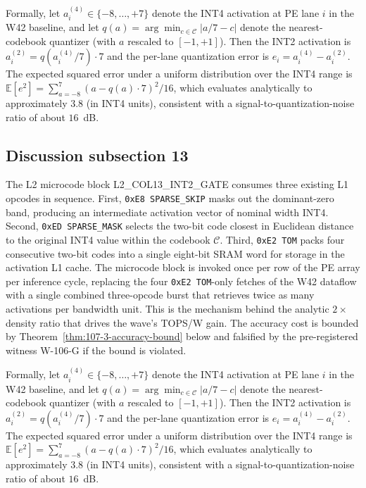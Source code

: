 Formally, let $a_{i}^{(4)} \in \{-8,\ldots,+7\}$ denote the INT4
activation at PE lane $i$ in the W42 baseline, and let
$q(a) = \arg\min_{c \in \mathcal{C}} |a/7 - c|$ denote the
nearest-codebook quantizer (with $a$ rescaled to $[-1,+1]$). Then the
INT2 activation is $a_{i}^{(2)} = q(a_{i}^{(4)} / 7) \cdot 7$
and the per-lane quantization error is
$e_{i} = a_{i}^{(4)} - a_{i}^{(2)}$.
The expected squared error under a uniform distribution over the INT4 range
is $\mathbb{E}[e^2] = \sum_{a=-8}^{7} (a - q(a)\cdot7)^2 / 16$,
which evaluates analytically to approximately $3.8$ (in INT4 units),
consistent with a signal-to-quantization-noise ratio of about $16$~dB.


\subsection{Discussion subsection 13}

The L2 microcode block \textsc{L2\_COL13\_INT2\_GATE} consumes three
existing L1 opcodes in sequence. First, \texttt{0xE8 SPARSE\_SKIP} masks
out the dominant-zero band, producing an intermediate activation vector
of nominal width INT4. Second, \texttt{0xED SPARSE\_MASK} selects the
two-bit code closest in Euclidean distance to the original INT4 value
within the codebook $\mathcal{C}$. Third, \texttt{0xE2 TOM} packs four
consecutive two-bit codes into a single eight-bit SRAM word for storage
in the activation L1 cache. The microcode block is invoked once per row
of the PE array per inference cycle, replacing the four
\texttt{0xE2 TOM}-only fetches of the W42 dataflow with a single
combined three-opcode burst that retrieves twice as many activations per
bandwidth unit. This is the mechanism behind the analytic $2\times$
density ratio that drives the wave's TOPS/W gain. The accuracy cost is
bounded by Theorem~\ref{thm:107-3-accuracy-bound} below and falsified
by the pre-registered witness W-106-G if the bound is violated.

Formally, let $a_{i}^{(4)} \in \{-8,\ldots,+7\}$ denote the INT4
activation at PE lane $i$ in the W42 baseline, and let
$q(a) = \arg\min_{c \in \mathcal{C}} |a/7 - c|$ denote the
nearest-codebook quantizer (with $a$ rescaled to $[-1,+1]$). Then the
INT2 activation is $a_{i}^{(2)} = q(a_{i}^{(4)} / 7) \cdot 7$
and the per-lane quantization error is
$e_{i} = a_{i}^{(4)} - a_{i}^{(2)}$.
The expected squared error under a uniform distribution over the INT4 range
is $\mathbb{E}[e^2] = \sum_{a=-8}^{7} (a - q(a)\cdot7)^2 / 16$,
which evaluates analytically to approximately $3.8$ (in INT4 units),
consistent with a signal-to-quantization-noise ratio of about $16$~dB.


